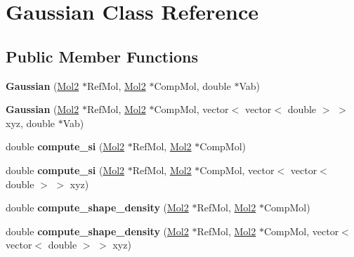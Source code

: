 \hypertarget{classGaussian}{
\section{Gaussian Class Reference}
\label{classGaussian}
}
\subsection*{Public Member Functions}
\begin{DoxyCompactItemize}
\item 
\hypertarget{classGaussian_a62de70c599d1558b705e39ef9f176f3c}{
{\bfseries Gaussian} (\hyperlink{classMol2}{Mol2} $\ast$RefMol, \hyperlink{classMol2}{Mol2} $\ast$CompMol, double $\ast$Vab)}
\label{classGaussian_a62de70c599d1558b705e39ef9f176f3c}

\item 
\hypertarget{classGaussian_a469209c4c984a0118d3f4a6efc693d05}{
{\bfseries Gaussian} (\hyperlink{classMol2}{Mol2} $\ast$RefMol, \hyperlink{classMol2}{Mol2} $\ast$CompMol, vector$<$ vector$<$ double $>$ $>$ xyz, double $\ast$Vab)}
\label{classGaussian_a469209c4c984a0118d3f4a6efc693d05}

\item 
\hypertarget{classGaussian_aa42c109a39b13f847009947a77cd06b0}{
double {\bfseries compute\_\-si} (\hyperlink{classMol2}{Mol2} $\ast$RefMol, \hyperlink{classMol2}{Mol2} $\ast$CompMol)}
\label{classGaussian_aa42c109a39b13f847009947a77cd06b0}

\item 
\hypertarget{classGaussian_ac8b23b3c00889eb1f38da472f9b67fb6}{
double {\bfseries compute\_\-si} (\hyperlink{classMol2}{Mol2} $\ast$RefMol, \hyperlink{classMol2}{Mol2} $\ast$CompMol, vector$<$ vector$<$ double $>$ $>$ xyz)}
\label{classGaussian_ac8b23b3c00889eb1f38da472f9b67fb6}

\item 
\hypertarget{classGaussian_a3fd619ab0bd48e3c46537194411de25e}{
double {\bfseries compute\_\-shape\_\-density} (\hyperlink{classMol2}{Mol2} $\ast$RefMol, \hyperlink{classMol2}{Mol2} $\ast$CompMol)}
\label{classGaussian_a3fd619ab0bd48e3c46537194411de25e}

\item 
\hypertarget{classGaussian_a61cf17d52f0efe6f8b5933023056d6c9}{
double {\bfseries compute\_\-shape\_\-density} (\hyperlink{classMol2}{Mol2} $\ast$RefMol, \hyperlink{classMol2}{Mol2} $\ast$CompMol, vector$<$ vector$<$ double $>$ $>$ xyz)}
\label{classGaussian_a61cf17d52f0efe6f8b5933023056d6c9}


\end{DoxyCompactItemize}
